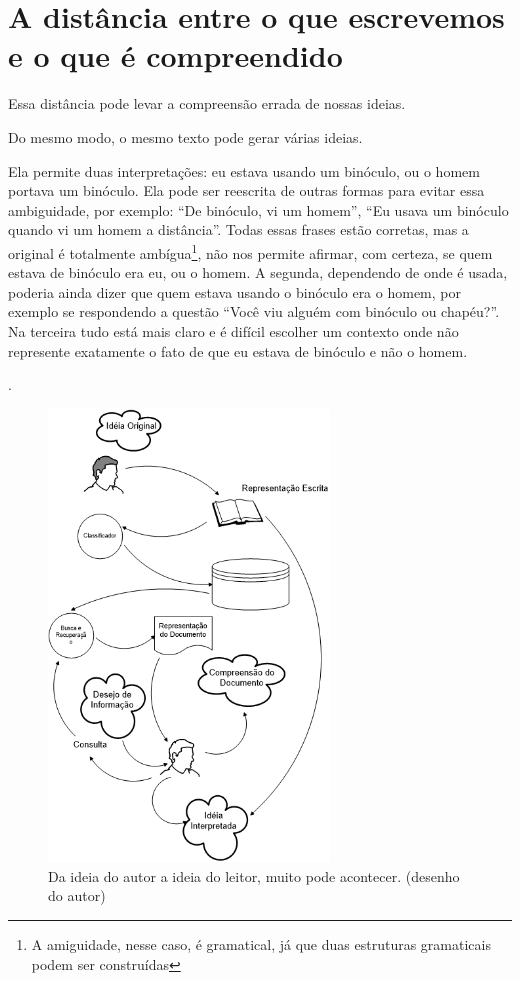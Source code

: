 \documentclass[openany]{book}
\begin{document}
\section{A distância entre o que escrevemos e o que é compreendido}

 Essa distância pode levar a compreensão errada de nossas ideias.

 Do mesmo modo, o mesmo texto pode gerar várias ideias.

Ela permite duas interpretações: eu estava usando um binóculo, ou o homem portava um binóculo. Ela pode ser reescrita de outras formas para evitar essa ambiguidade, por exemplo: \enquote{De binóculo, vi um homem}, \enquote{Eu usava um binóculo quando vi um homem a distância}. Todas essas frases estão corretas, mas a original é totalmente ambígua\footnote{A amiguidade, nesse caso, é gramatical, já que duas estruturas gramaticais podem ser construídas}, não nos permite afirmar, com certeza, se quem estava de binóculo era eu, ou o homem. A segunda, dependendo de onde é usada, poderia ainda dizer que quem estava usando o binóculo era o homem, por exemplo se respondendo a questão ``Você viu alguém com binóculo ou chapéu?''.
Na terceira tudo está mais claro e é difícil escolher um contexto onde não represente exatamente o fato de que eu estava de binóculo e não o homem.

.

\begin{figure}
    \centering
    \includegraphics[height=12cm]{imagens/textretrieval.png}
    \caption{Da ideia do autor a ideia do leitor, muito pode acontecer. (desenho do autor)}
    \label{fig:tr1}
\end{figure}
\end{document}
